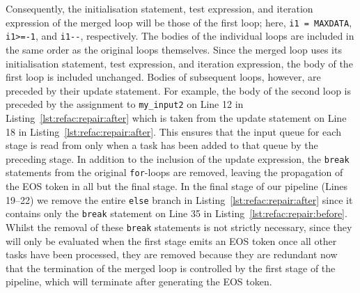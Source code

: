 %
Consequently, the initialisation statement, test expression, and iteration expression of the merged loop will be those of the first loop; here, \lstinline|i1 = MAXDATA|, \lstinline|i1>=-1|, and \lstinline|i1--|, respectively.
%
The bodies of the individual loops are included in the same order as the original loops themselves. Since the merged loop uses its initialisation statement, test expression, and iteration expression, the body of the first loop is included unchanged.
%
Bodies of subsequent loops, however, are preceded by their update statement. For example, the body of the second loop is preceded by the assignment to \lstinline|my_input2| on Line 12 in Listing~\ref{lst:refac:repair:after} which is taken from the update statement on Line 18 in Listing~\ref{lst:refac:repair:after}. This ensures that the input queue for each stage is read from only when a task has been added to that queue by the preceding stage.
%
In addition to the inclusion of the update expression, the \lstinline|break| statements from the original \lstinline|for|-loops are removed, leaving the propagation of the EOS token in all but the final stage. In the final stage of our pipeline (Lines 19--22) we remove the entire \lstinline|else| branch in Listing~\ref{lst:refac:repair:after} since it contains only the \lstinline|break| statement on Line 35 in Listing~\ref{lst:refac:repair:before}. Whilst the removal of these \lstinline|break| statements is not strictly necessary, since they will only be evaluated when the first stage emits an EOS token once all other tasks have been processed, they are removed because they are redundant now that the termination of the merged loop is controlled by the first stage of the pipeline, which will terminate after generating the EOS token.






